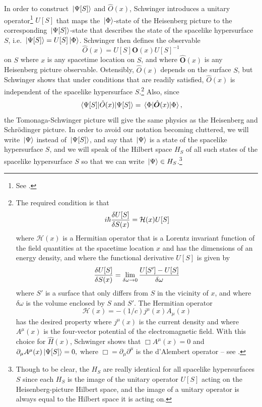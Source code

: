 In order to construct $\ket*{\Psi[S]}$ and $\hat{O}(x)$, Schwinger introduces a unitary operator\footnote{See \cite[p. 1448]{SchwingerJulianI}.} $U[S]$ that maps the $\ket*{\Phi}$-state of the Heisenberg picture to the corresponding $\ket*{\Psi[S]}$-state that describes the state of the spacelike hypersurface $S$, i.e. $\ket*{\Psi[S]}=U[S]\ket*{\Phi}$. Schwinger then defines the observable  
\begin{equation}\label{tsobservable}
  \hat{O}(x)=U[S]\hat{\bm{O}}(x)U[S]^{-1}
\end{equation}
on $S$ where $x$ is any spacetime location on $S$, and where $\hat{\bm{O}}(x)$ is any Heisenberg picture observable. Ostensibly, $\hat{O}(x)$ depends on the surface $S$,  but Schwinger shows that under conditions that are readily satisfied, $\hat{O}(x)$ is independent of the spacelike hypersurface $S$.\footnote{
  The required condition is that 
  $$i\hbar\fdv{U[S]}{S(x)}=\mathcal{H}(x)U[S] $$
  where $\mathcal{H}(x)$ is a Hermitian operator that is a Lorentz invariant function of the field quantities at the spacetime location $x$ and has the dimensions of an energy density, and where the functional derivative $U[S]$ is given by
  $$\fdv{U[S]}{S(x)}=\lim_{\delta \omega\rightarrow 0}\frac{U[S']-U[S]}{\delta\omega} $$
  where $S'$ is a surface that only differs from $S$ in the vicinity of $x$, and where $\delta\omega$ is the volume enclosed by $S$ and $S'$. The Hermitian operator $$\mathcal{H}(x)=-(1/c)j^\mu(x)A_\mu(x)$$
  has the desired property where $j^\mu(x)$ is the current density and where $A^\mu(x)$ is the four-vector potential of the electromagnetic field. With this choice for $\hat{H}(x)$, Schwinger shows that $\Box A^\mu(x)=0$ and $\partial_\mu A^\mu(x)\ket*{\Psi[S]}=0,$ where $\Box=\partial_\mu\partial^\mu$ is the d'Alembert operator -- see \cite[p. 1449-1450]{SchwingerJulianI}.\label{Sindepedence}  }
  Also, since 
\begin{equation}\label{schwingerformula}
\ev*{\hat{O}(x)}{\Psi[S]}=\ev*{\hat{\bm{O}}(x)}{\Phi},
\end{equation}
the Tomonaga-Schwinger picture will give the same physics as the Heisenberg and Schr\"{o}dinger picture. In order to avoid our notation becoming cluttered, we will write $\ket*{\Psi}$ instead of $\ket*{\Psi[S]}$, and say that $\ket*{\Psi}$ is a state of the spacelike hypersurface $S$, and we will speak of the Hilbert space $H_S$\label{HSdef} of all such states of the spacelike hypersurface $S$ so that we can write $\ket*{\Psi}\in H_S$.\footnote{Though to be clear,\label{HSclarification} the $H_S$ are really identical for all spacelike hypersurfaces $S$ since each $H_S$ is the image of the unitary operator $U[S]$ acting on the Heisenberg-picture Hilbert space, and the image of a unitary operator is always equal to the Hilbert space it is acting on.}

